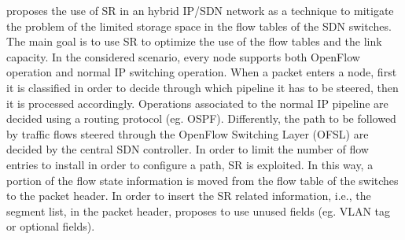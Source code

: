 \cite{li2017segment} proposes the use of SR in an hybrid IP/SDN network as a technique to mitigate the problem of the limited storage space in the flow tables of the SDN switches.
The main goal is to use SR to optimize the use of the flow tables and the link capacity.
In the considered scenario, every node supports both OpenFlow operation and normal IP switching operation.
When a packet enters a node, first it is classified in order to decide through which pipeline it has to be steered, then it is processed accordingly.
Operations associated to the normal IP pipeline are decided using a routing protocol (eg. OSPF).
Differently, the path to be followed by traffic flows steered through the OpenFlow Switching Layer (OFSL) are decided by the central SDN controller.
In order to limit the number of flow entries to install in order to configure a path, SR is exploited.
In this way, a portion of the flow state information is moved from the flow table of the switches to the packet header.
In order to insert the SR related information, i.e., the segment list, in the packet header, \cite{li2017segment} proposes to use unused fields (eg. VLAN tag or optional fields).

